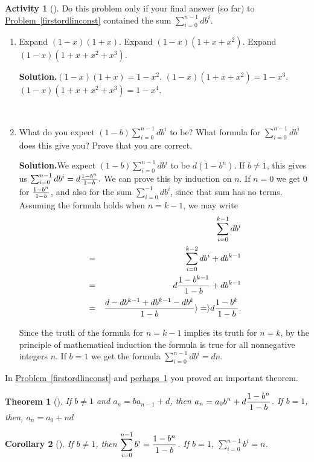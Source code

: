 \documentclass[10pt,]{book}
\theoremstyle{plain}
\newtheorem{theorem}{Theorem}[section]
\newtheorem{corollary}[theorem]{Corollary}
\theoremstyle{definition}
\newtheorem{activity}[project]{Activity}
\numberwithin{equation}{chapter}
\newcommand{\amp}{&}
\begin{document}
\begin{activity}[]\label{sumgeometricseries}
Do this problem only if your final answer (so far) to \hyperref[firstordlinconst]{Problem~\ref{firstordlinconst}} contained the sum \(\sum_{i=0}^{n-1}db^i\).%
~\par
\begin{enumerate}[label=(\alph*)]
 \item Expand \((1-x)(1+x)\).  Expand \((1-x)(1+x+x^2)\). Expand \((1-x)(1+x+x^2+x^3)\).%
\par\medskip\noindent%
\textbf{Solution.}\quad \((1-x)(1+x)=1-x^2\). \((1-x)(1+x+x^2)=1-x^3\). \((1-x)(1+x+x^2+x^3)=1-x^4\).%

~\par
\item What do you expect \((1-b)\sum_{i=0}^{n-1} db^i\) to be?  What formula for \(\sum_{i=0}^{n-1}db^i\) does this give you?  Prove that you are correct.%
\par\medskip\noindent%
\textbf{Solution.}\quad We expect \((1-b)\sum_{i=0}^{n-1} db^i\) to be \(d(1-b^n)\). If \(b\not=1\), this gives us \(\sum_{i=0}^{n-1}db^i=d{1-b^n\over 1-b}.\) We can prove this by induction on \(n\). If \(n=0\) we get 0 for \(1-b^n\over 1-b\), and also for the sum \(\sum_{i=0}^{-1}db^i\), since that sum has no terms. Assuming the formula holds when \(n=k-1\), we may write%
\begin{align*}
\amp \amp \sum_{i=0}^{k-1} db^i\\
\amp =\amp \sum_{i=0}^{k-2}db^i+db^{k-1}\\
\amp =\amp d{1-b^{k-1}\over 1-b}+db^{k-1}\\
\amp =\amp { d-db^{k-1}  +db^{k-1}-db^k\over 1-b}\rangle =\rangle  d{1-b^k\over 1-b}.
\end{align*}
%
\par
Since the truth of the formula for \(n=k-1\) implies its truth for \(n=k\), by the principle of mathematical induction the formula is true for all nonnegative integers \(n\). If \(b=1\) we get the formula \(\sum_{i=0}^{n-1}db^i=dn\).%

\end{enumerate}
\end{activity}
In \hyperref[firstordlinconst]{Problem~\ref{firstordlinconst}} and \hyperref[sumgeometricseries]{perhaps~\ref{sumgeometricseries}} you proved an important theorem.%
\begin{theorem}[{}]\label{theorem-1}
If \(b\not=1\) and \(a_n=ba_{n-1} +d\), then \(\displaystyle a_n =
a_0b^n + d{1-b^n\over 1-b}\). If \(b=1\), then, \(\displaystyle a_n =
a_0 +nd\)%
\end{theorem}
\begin{corollary}[{}]\label{corollary-1}
If \(b\not=1\), then \(\displaystyle \sum_{i=0}^{n-1}b^i =
{1-b^n\over 1-b}\). If \(b=1\), \(\displaystyle \sum_{i=0}^{n-1}b^i =n\).%
\end{corollary}
\typeout{************************************************}
\typeout{************************************************}
\end{document}
